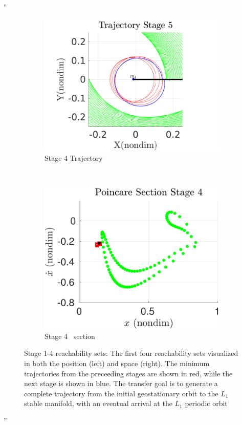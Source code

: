 \documentclass[11pt]{article}
\newenvironment{correction}{\begin{list}{}{\setlength{\leftmargin}{1cm}\setlength{\rightmargin}{1cm}}\vspace{\parsep}\item[]``}{''\end{list}}
\begin{document}
\begin{enumerate}
\begin{correction}
\begin{figure}[H]
    \begin{subfigure}[htbp]{0.2\textwidth} 
        \includegraphics[width=\textwidth, keepaspectratio]{figures/geo_transfer/stage5_trajectory_zoom.pdf} 
        \caption{Stage 4 Trajectory~} 
    \end{subfigure}~
    \begin{subfigure}[htbp]{0.2\textwidth} 
        \includegraphics[width=\textwidth, keepaspectratio]{figures/geo_transfer/stage4_poincare.pdf} 
        \caption{Stage 4 \Poincare~section } 
    \end{subfigure}   
    \caption{Stage 1-4 reachability sets: The first four reachability sets visualized in both the position (left) and \Poincare space (right).
        The minimum trajectories from the preceeding stages are shown in red, while the next stage is shown in blue.
    The transfer goal is to generate a complete trajectory from the initial geostationary orbit to the \( L_1 \) stable manifold, with an eventual arrival at the \( L_1 \) periodic orbit}
\end{figure}


\end{correction}
\end{enumerate}
\end{document}
